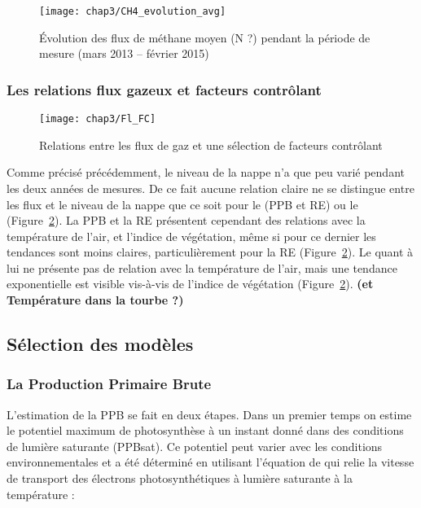 \begin{figure}
\centering
\texttt{[image: chap3/CH4\_evolution\_avg]}
\caption{Évolution des flux de méthane moyen (N ?) pendant la période de mesure (mars 2013 -- février 2015)}
\label{fig:CH4_evolution_avg}
\end{figure}



\subsubsection{Les relations flux gazeux et facteurs contrôlant}

\begin{figure}
\centering
\texttt{[image: chap3/Fl\_FC]}
\caption{Relations entre les flux de gaz et une sélection de facteurs contrôlant}
\label{fig:Fl_FC}
\end{figure}

Comme précisé précédemment, le niveau de la nappe n'a que peu varié pendant les deux années de mesures.
De ce fait aucune relation claire ne se distingue entre les flux et le niveau de la nappe que ce soit pour le \coo (PPB et RE) ou le \chh (Figure~\ref{fig:Fl_FC}).
La PPB et la RE présentent cependant des relations avec la température de l'air, et l'indice de végétation, même si pour ce dernier les tendances sont moins claires, particulièrement pour la RE (Figure~\ref{fig:Fl_FC}).
Le \chh quant à lui ne présente pas de relation avec la température de l'air, mais une tendance exponentielle est visible vis-à-vis de l'indice de végétation (Figure~\ref{fig:Fl_FC}).
\textbf{(\chh et Température dans la tourbe ?)}

\subsection{Sélection des modèles}

\subsubsection{La Production Primaire Brute}


L'estimation de la PPB se fait en deux étapes.
Dans un premier temps on estime le potentiel maximum de photosynthèse à un instant donné dans des conditions de lumière saturante (PPBsat).
Ce potentiel peut varier avec les conditions environnementales et a été déterminé en utilisant l'équation de \citep{june2004} qui relie la vitesse de transport des électrons photosynthétiques à lumière saturante à la température :

